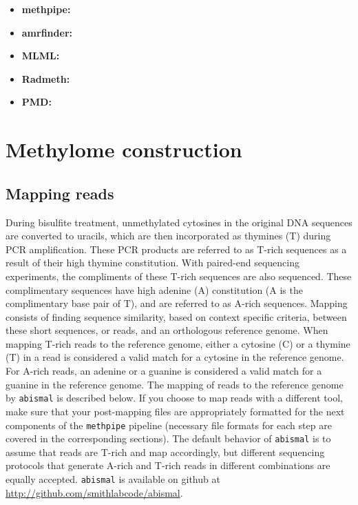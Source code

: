 \documentclass[10pt]{article}
\newcommand{\meth}{\texttt{methpipe}}
\newcommand{\prog}[1]{\texttt{#1}}
\begin{document}
\begin{itemize}

\item{\textbf{methpipe:}} 

\item{\textbf{amrfinder:}} 

\item{\textbf{MLML:}} 

\item{\textbf{Radmeth:}} 

\item{\textbf{PMD:}} 

\end{itemize}

\section{Methylome construction}

\subsection{Mapping reads}
\label{sec:mapping}


During bisulfite treatment, unmethylated cytosines in the original DNA
sequences are converted to uracils, which are then incorporated as
thymines (T) during PCR amplification. These PCR products are referred
to as T-rich sequences as a result of their high thymine constitution.
With paired-end sequencing experiments, the compliments of these
T-rich sequences are also sequenced.  These complimentary sequences
have high adenine (A) constitution (A is the complimentary base pair
of T), and are referred to as A-rich sequences. Mapping consists of
finding sequence similarity, based on context specific criteria,
between these short sequences, or reads, and an orthologous reference
genome.  When mapping T-rich reads to the reference genome, either a
cytosine (C) or a thymine (T) in a read is considered a valid match
for a cytosine in the reference genome. For A-rich reads, an adenine
or a guanine is considered a valid match for a guanine in the
reference genome. The mapping of reads to the reference genome by
\prog{abismal} is described below. If you choose to map reads with a
different tool, make sure that your post-mapping files are
appropriately formatted for the next components of the \meth{}
pipeline (necessary file formats for each step are covered in the
corresponding sections).  The default behavior of \prog{abismal} is to
assume that reads are T-rich and map accordingly, but different
sequencing protocols that generate A-rich and T-rich reads in
different combinations are equally accepted. \prog{abismal} is
available on github at \href{http://github.com/smithlabcode/abismal}
{http://github.com/smithlabcode/abismal}.
\end{document}
